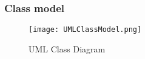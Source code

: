 \newpage
\subsubsection*{Class model}
\begin{figure}[ht!]
\centering
\texttt{[image: UMLClassModel.png]}
\caption{UML Class Diagram \label{overflow}}
\end{figure}